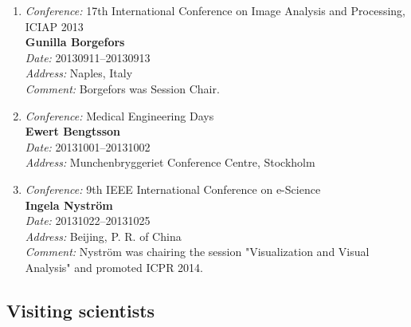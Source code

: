 \begin{enumerate}
\item 
{\em Conference:} 17th International Conference on Image Analysis and Processing, ICIAP 2013~\\
{\bf Gunilla Borgefors}~\\
{\em Date:} 20130911--20130913~\\
{\em Address:} Naples, Italy~\\
{\em Comment:} Borgefors was Session Chair.

\item 
{\em Conference:} Medical Engineering Days~\\
{\bf Ewert Bengtsson}~\\
{\em Date:} 20131001--20131002~\\
{\em Address:} Munchenbryggeriet Conference Centre, Stockholm

\item 
{\em Conference:} 9th IEEE International Conference on e-Science~\\
{\bf Ingela Nystr\"{o}m}~\\
{\em Date:} 20131022--20131025~\\
{\em Address:} Beijing, P. R. of China~\\
{\em Comment:} Nystr\"{o}m was chairing the session "Visualization and Visual Analysis" and promoted ICPR 2014.

\end{enumerate}


\subsection{Visiting scientists}

